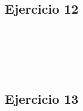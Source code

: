 \documentclass[10pt,a4paper]{article}
\begin{document}
\subsubsection{}
    \begin{lstlisting}
    \end{lstlisting}
\subsection{Ejercicio 12}
\subsubsection{}
    \begin{lstlisting}
    \end{lstlisting}
\subsubsection{}
    \begin{lstlisting}
    \end{lstlisting}
\subsubsection{}
    \begin{lstlisting}
    \end{lstlisting}
\subsubsection{}
    \begin{lstlisting}
    \end{lstlisting}
\subsection{Ejercicio 13}
\subsubsection{}
    \begin{lstlisting}
    \end{lstlisting}
\subsubsection{}
    \begin{lstlisting}
    \end{lstlisting}
\subsubsection{}
    \begin{lstlisting}
    \end{lstlisting}
\subsubsection{}
    \begin{lstlisting}
    \end{lstlisting}
\subsubsection{}
    \begin{lstlisting}
    \end{lstlisting}
\subsubsection{}
    \begin{lstlisting}
    \end{lstlisting}
\end{document}
